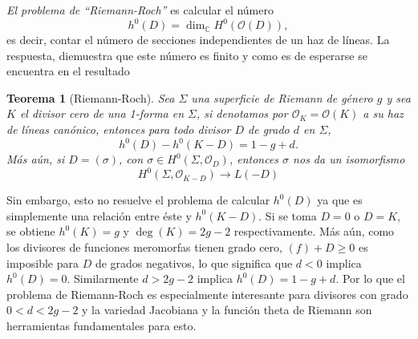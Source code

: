 \documentclass[letterpaper]{article}
\newtheorem{teorema}{Teorema}[section]
\newcommand{\sig}{\ensuremath{\Sigma}}
\newcommand{\co}{\ensuremath{\mathbb C }}
\newcommand{\lnb}{\ensuremath{\mathcal{O}}}
\begin{document}
\emph{El problema de ``Riemann-Roch''} es calcular el número
\[
  h^{0}(D)=\dim_{\co}H^{0}(\lnb(D)),
\]
es decir, contar el número de secciones independientes de un haz de líneas. La respuesta, diemuestra que este número es finito y como es de esperarse se encuentra en el resultado
\begin{teorema}[Riemann-Roch]
  Sea \(\sig\) una superficie de Riemann de género \(g\) y sea \(K\) el divisor cero de una 1-forma en \(\sig\), si denotamos por \(\lnb_{K}=\lnb(K)\) a su haz de líneas canónico, entonces para todo divisor \(D\) de grado \(d\) en \(\sig\),
  \[
    h^{0}(D)-h^{0}(K-D)=1-g+d.
  \]
  Más aún, si \(D=(\sigma)\), con \(\sigma\in H^{0}(\sig,\lnb_{D}) \), entonces \(\sigma\) nos da un isomorfismo
  \[
    H^{0}(\sig,\lnb_{K-D})\rightarrow L(-D)
  \]

\end{teorema}
Sin embargo, esto no resuelve el problema de calcular \(h^{0}(D)\) ya que es simplemente una relación entre éste y \(h^{0}(K-D)\). Si se toma \(D=0\) o \(D=K\), se obtiene \(h^{0}(K)=g\) y \(\deg(K)=2g-2\) respectivamente. Más aún, como los divisores de funciones meromorfas tienen grado cero, \((f)+D\geq0\) es imposible para \(D\) de grados negativos, lo que significa que \(d<0\) implica \(h^{0}(D)=0\). Similarmente \(d>2g-2\) implica \(h^{0}(D)=1-g+d\). Por lo que el problema de Riemann-Roch es especialmente interesante para divisores con grado \(0<d<2g-2\) y la variedad Jacobiana y la función theta de Riemann son herramientas fundamentales para esto.
\end{document}
